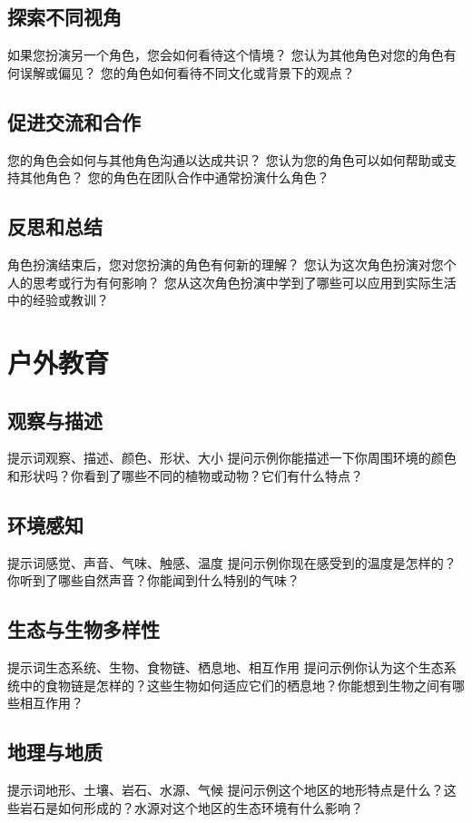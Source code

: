 \documentclass[12pt]{book}
\begin{document}
\subsection{探索不同视角}
如果您扮演另一个角色，您会如何看待这个情境？
您认为其他角色对您的角色有何误解或偏见？
您的角色如何看待不同文化或背景下的观点？

\subsection{促进交流和合作}
您的角色会如何与其他角色沟通以达成共识？
您认为您的角色可以如何帮助或支持其他角色？
您的角色在团队合作中通常扮演什么角色？

\subsection{反思和总结}
角色扮演结束后，您对您扮演的角色有何新的理解？
您认为这次角色扮演对您个人的思考或行为有何影响？
您从这次角色扮演中学到了哪些可以应用到实际生活中的经验或教训？


\section{户外教育}
\subsection{观察与描述}
提示词观察、描述、颜色、形状、大小
提问示例你能描述一下你周围环境的颜色和形状吗？你看到了哪些不同的植物或动物？它们有什么特点？

\subsection{环境感知}
提示词感觉、声音、气味、触感、温度
提问示例你现在感受到的温度是怎样的？你听到了哪些自然声音？你能闻到什么特别的气味？

\subsection{生态与生物多样性}
提示词生态系统、生物、食物链、栖息地、相互作用
提问示例你认为这个生态系统中的食物链是怎样的？这些生物如何适应它们的栖息地？你能想到生物之间有哪些相互作用？

\subsection{地理与地质}
提示词地形、土壤、岩石、水源、气候
提问示例这个地区的地形特点是什么？这些岩石是如何形成的？水源对这个地区的生态环境有什么影响？
\end{document}
